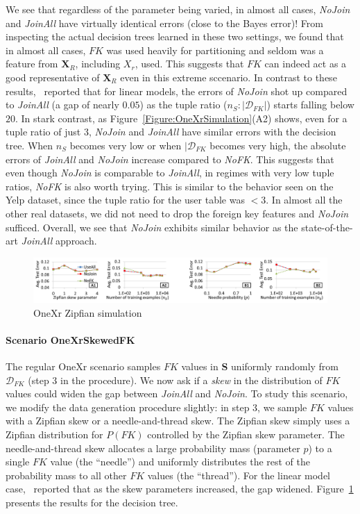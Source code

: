 \documentclass[sigconf]{acmart}
\begin{document}
We see that regardless of the parameter being varied, in almost all cases, \textit{NoJoin} and \textit{JoinAll} have virtually identical errors (close to the Bayes 
error)! From inspecting the actual decision trees learned in these two settings, we found that in almost all cases, $FK$ was used heavily for partitioning and seldom was 
a feature from $\textbf{X}_R$, including $X_r$, used. This suggests that $FK$ can indeed act as a good representative of $\textbf{X}_R$ even in this extreme sccenario. 
In contrast to these results,~\cite{hamlet} reported that for linear models, the errors of \textit{NoJoin} shot up compared to \textit{JoinAll} (a gap of nearly $0.05$)
as the tuple ratio ($n_S : |\mathcal{D}_{FK}|$) starts falling below $20$. In stark contrast, as Figure~\ref{Figure:OneXrSimulation}(A2) shows, even for a tuple ratio of 
just $3$, \textit{NoJoin} and \textit{JoinAll} have similar errors with the decision tree. When $n_S$ becomes very low or when $|\mathcal{D}_{FK}$ becomes very high,
the absolute errors of \textit{JoinAll} and \textit{NoJoin} increase compared to \textit{NoFK}. This suggests that even though \textit{NoJoin} is comparable to 
\textit{JoinAll}, in regimes with very low tuple ratios, \textit{NoFK} is also worth trying. This is similar to the behavior seen on the Yelp dataset, since the tuple 
ratio for the user table was $< 3$. In almost all the other real datasets, we did not need to drop the foreign key features and \textit{NoJoin} sufficed.
Overall, we see that \textit{NoJoin} exhibits similar behavior as the state-of-the-art \textit{JoinAll} approach.

\begin{figure}
\centering
\includegraphics[width=2\columnwidth,height=\textheight,keepaspectratio]{onexr_zipf.png}
\caption{OneXr Zipfian simulation}
\label{Figure:OneXrZipfSimulation}
\end{figure}

\paragraph*{Scenario OneXrSkewedFK}
The regular OneXr scenario samples $FK$ values in \textbf{S} uniformly randomly from $\mathcal{D}_{FK}$ (step 3 in the procedure). We now ask if a \textit{skew} in 
the distribution of $FK$ values could widen the gap between \textit{JoinAll} and \textit{NoJoin}. To study this scenario, we modify the data generation procedure slightly:
in step 3, we sample $FK$ values with a Zipfian skew or a needle-and-thread skew. The Zipfian skew simply uses a Zipfian distribution for $P(FK)$ controlled by the Zipfian
skew parameter. The needle-and-thread skew allocates a large probability mass (parameter $p$) to a single $FK$ value (the ``needle'') and uniformly distributes the rest of 
the probability mass to all other $FK$ values (the ``thread''). For the linear model case,~\cite{hamlet} reported that as the skew parameters increased, the gap widened.
Figure~\ref{Figure:OneXrZipfSimulation} presents the results for the decision tree.
\end{document}
